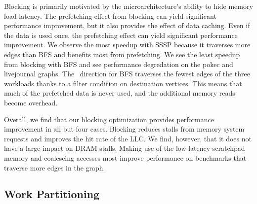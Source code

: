 Blocking is primarily motivated by the microarchitecture's ability to hide memory load latency.
The prefetching effect from blocking can yield significant performance improvement, but it also provides the effect of data caching.
Even if the data is used once, the prefetching effect can yield significant performance improvement. 
We observe the most speedup with SSSP because it traverses more edges than BFS and benefits most from prefetching.
We see the least speedup from blocking with BFS and see performance degredation on the pokec and livejournal graphs.
The \pull~direction for BFS traverses the fewest edges of the three workloads thanks to a filter condition on destination vertices.
This means that much of the prefetched data is never used, and the additional memory reads become overhead.

Overall, we find that our blocking optimization provides performance improvement in all but four cases. 
Blocking reduces stalls from memory system requests and improves the hit rate of the LLC. 
We find, however, that it does not have a large impact on DRAM stalls.
Making use of the low-latency scratchpad memory and coalescing accesses most improve performance on benchmarks that traverse more edges in the graph. 
 
\subsection{Work Partitioning}

